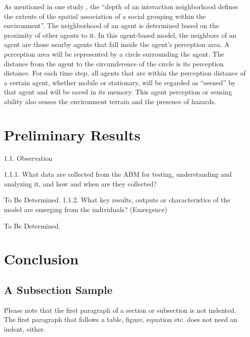 \documentclass[runningheads]{llncs}
\begin{document}
As mentioned in one study \cite{power2009spatial}, the “depth of an interaction neighborhood defines the extents of the spatial association of a social grouping within the environment”. The neighborhood of an agent is determined based on the proximity of other agents to it. In this agent-based model, the neighbors of an agent are those nearby agents that fall inside the agent’s perception area. A perception area will be represented by a circle surrounding the agent. The distance from the agent to the circumference of the circle is its perception distance. For each time step, all agents that are within the perception distance of a certain agent, whether mobile or stationary, will be regarded as “seened” by that agent and will be saved in its memory. This agent perception or sensing ability also senses the environment terrain and the presence of hazards.  





\section{Preliminary Results}
1.1.	Observation

1.1.1.	What data are collected from the ABM for testing, understanding and analyzing it, and how and when are they collected?

To Be Determined.
1.1.2.	What key results, outputs or characteristics of the model are emerging from the individuals? (Emergence)

To Be Determined.


\section{Conclusion}






\subsection{A Subsection Sample}
Please note that the first paragraph of a section or subsection is
not indented. The first paragraph that follows a table, figure,
equation etc. does not need an indent, either.
\end{document}
